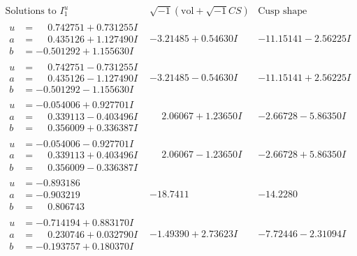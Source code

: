 \documentclass[1p]{elsarticle_modified}
\theoremstyle{definition}
\newcommand{\I}{\sqrt{-1}}
\begin{document}
$$\begin{array}{c|c|c}  
\text{Solutions to }I^u_{1}& \I (\text{vol} + \sqrt{-1}CS) & \text{Cusp shape}\\
 \hline 
\begin{aligned}
u &= \phantom{-}0.742751 + 0.731255 I \\
a &= \phantom{-}0.435126 + 1.127490 I \\
b &= -0.501292 + 1.155630 I\end{aligned}
 & -3.21485 + 0.54630 I & -11.15141 - 2.56225 I \\ \hline\begin{aligned}
u &= \phantom{-}0.742751 - 0.731255 I \\
a &= \phantom{-}0.435126 - 1.127490 I \\
b &= -0.501292 - 1.155630 I\end{aligned}
 & -3.21485 - 0.54630 I & -11.15141 + 2.56225 I \\ \hline\begin{aligned}
u &= -0.054006 + 0.927701 I \\
a &= \phantom{-}0.339113 - 0.403496 I \\
b &= \phantom{-}0.356009 + 0.336387 I\end{aligned}
 & \phantom{-}2.06067 + 1.23650 I & -2.66728 - 5.86350 I \\ \hline\begin{aligned}
u &= -0.054006 - 0.927701 I \\
a &= \phantom{-}0.339113 + 0.403496 I \\
b &= \phantom{-}0.356009 - 0.336387 I\end{aligned}
 & \phantom{-}2.06067 - 1.23650 I & -2.66728 + 5.86350 I \\ \hline\begin{aligned}
u &= -0.893186\phantom{ +0.000000I} \\
a &= -0.903219\phantom{ +0.000000I} \\
b &= \phantom{-}0.806743\phantom{ +0.000000I}\end{aligned}
 & -18.7411\phantom{ +0.000000I} & -14.2280\phantom{ +0.000000I} \\ \hline\begin{aligned}
u &= -0.714194 + 0.883170 I \\
a &= \phantom{-}0.230746 + 0.032790 I \\
b &= -0.193757 + 0.180370 I\end{aligned}
 & -1.49390 + 2.73623 I & -7.72446 - 2.31094 I \\ \hline\begin{aligned}

\end{aligned}
\end{array}$$
\end{document}
